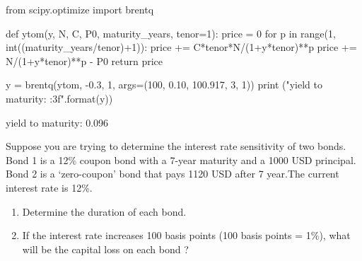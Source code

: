 \cprotEnv\begin{solution}
\begin{ipython}
from scipy.optimize import brentq

def ytom(y, N, C, P0, maturity_years, tenor=1): 
    price = 0
    for p in range(1, int((maturity_years/tenor)+1)):
        price += C*tenor*N/(1+y*tenor)**p
    price += N/(1+y*tenor)**p - P0 
    return price

y = brentq(ytom, -0.3, 1, args=(100, 0.10, 100.917, 3, 1))
print ("yield to maturity: {:3f}".format(y))
\end{ipython}
\begin{ioutput}
yield to maturity: 0.096
\end{ioutput}    
\end{solution}

\begin{question}
Suppose you are trying to determine the interest rate sensitivity of two bonds. Bond 1 is a 12\% coupon bond with a 7-year maturity and a 1000 USD principal. Bond 2 is a ‘zero-coupon’ bond that pays 1120 USD after 7 year.The current interest rate is 12\%.
\begin{enumerate}
\item Determine the duration of each bond.
\item If the interest rate increases 100 basis points (100 basis points = 1\%), what will be the capital loss on each bond ?
\end{enumerate}
\end{question}

